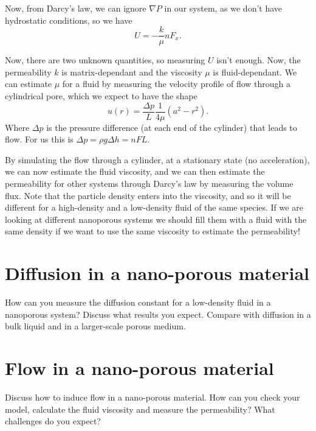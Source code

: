 \documentclass[a4paper, 11pt, notitlepage, english]{article}
\begin{document}
Now, from Darcy's law, we can ignore $\nabla P$ in our system, as we don't have hydrostatic conditions, so we have
$$U = -\frac{k}{\mu}nF_x.$$

Now, there are two unknown quantities, so measuring $U$ isn't enough. Now, the permeability $k$ is matrix-dependant and the viscosity $\mu$ is fluid-dependant. We can estimate $\mu$ for a fluid by measuring the velocity profile of flow through a cylindrical pore, which we expect to have the shape
$$u(r) = \frac{\Delta p}{L} \frac{1}{4\mu}(a^2 - r^2).$$
Where $\Delta p$ is the pressure difference (at each end of the cylinder) that leads to flow. For us this is $\Delta p = \rho g \Delta h = nFL$. 

By simulating the flow through a cylinder, at a stationary state (no acceleration), we can now estimate the fluid viscosity, and we can then estimate the permeability for other systems through Darcy's law by measuring the volume flux. Note that the particle density enters into the viscosity, and so it will be different for a high-density and a low-density fluid of the same species. If we are looking at different nanoporous systems we should fill them with a fluid with the same density if we want to use the same viscosity to estimate the permeability!


\clearpage


\section{Diffusion in a nano-porous material}
How can you measure the diffusion constant for a low-density fluid in a nanoporous
system? Discuss what results you expect. Compare with diffusion in a bulk liquid
and in a larger-scale porous medium.

\clearpage


\section{Flow in a nano-porous material}
Discuss how to induce flow in a nano-porous material. How can you check
your model, calculate the fluid viscosity and measure the permeability? What
challenges do you expect?

\clearpage

\end{document}
